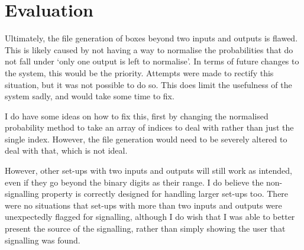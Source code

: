 \documentclass[report.tex]{subfiles}
\begin{document}
\section{Evaluation} %
\label{sec:evaluation}
Ultimately, the file generation of boxes beyond two inputs and outputs is
flawed. This is likely caused by not having a way to normalise the probabilities
that do not fall under `only one output is left to normalise'. In terms of
future changes to the system, this would be the priority. Attempts were made to 
rectify this situation, but it was not possible to do so. This does limit the
usefulness of the system sadly, and would take some time to fix.

I do have some ideas on how to fix this, first by changing the normalised
probability method to take an array of indices to deal with rather than just
the single index. However, the file generation would need to be severely altered
to deal with that, which is not ideal.

However, other set-ups with two inputs and outputs will still work as intended,
even if they go beyond the binary digits as their range. I do believe the
non-signalling property is correctly designed for handling larger set-ups too.
There were no situations that set-ups with more than two inputs and outputs were
unexpectedly flagged for signalling, although I do wish that I was able to
better present the source of the signalling, rather than simply showing the
user that signalling was found.

\newpage
\end{document}
